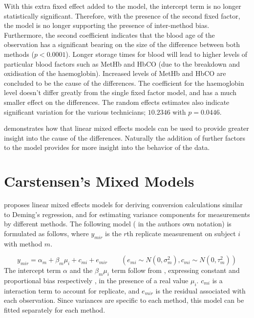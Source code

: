 \documentclass[12pt, a4paper]{report}
\begin{document}
With this extra fixed effect added to the model, the intercept
term is no longer statistically significant. Therefore, with the
presence of the second fixed factor, the model is no longer
supporting the presence of inter-method bias. Furthermore, the
second coefficient indicates that the blood age of the observation
has a significant bearing on the size of the difference between
both methods ($p <0.0001$). Longer storage times for blood will
lead to higher levels of particular blood factors such as MetHb
and HbCO (due to the breakdown and oxidisation of the
haemoglobin). Increased levels of MetHb and HbCO are concluded to
be the cause of the differences. The coefficient for the
haemoglobin level doesn't differ greatly from the single fixed
factor model, and has a much smaller effect on the differences.
The random effects estimates also indicate significant variation
for the various technicians; $10.2346$ with $p=0.0446$.

\citet{LaiShiao} demonstrates how that linear mixed effects models
can be used to provide greater insight into the cause of the
differences. Naturally the addition of further factors to the
model provides for more insight into the behavior of the data.



\newpage
\section{Carstensen's Mixed Models}

\citet{BXC2004} proposes linear mixed effects models for deriving
conversion calculations similar to Deming's regression, and for
estimating variance components for measurements by different
methods. The following model ( in the authors own notation) is
formulated as follows, where $y_{mir}$ is the $r$th replicate
measurement on subject $i$ with method $m$.

\begin{equation}
y_{mir}  = \alpha_{m} + \beta_{m}\mu_{i} + c_{mi} + e_{mir} \qquad
( e_{mi} \sim N(0,\sigma^{2}_{m}), c_{mi} \sim N(0,\tau^{2}_{m}))
\end{equation}
The intercept term $\alpha$ and the $\beta_{m}\mu_{i}$ term follow
from \citet{DunnSEME}, expressing constant and proportional bias
respectively , in the presence of a real value $\mu_{i}.$
 $c_{mi}$ is a interaction term to account for replicate, and
 $e_{mir}$ is the residual associated with each observation.
Since variances are specific to each method, this model can be
fitted separately for each method.
\end{document}

